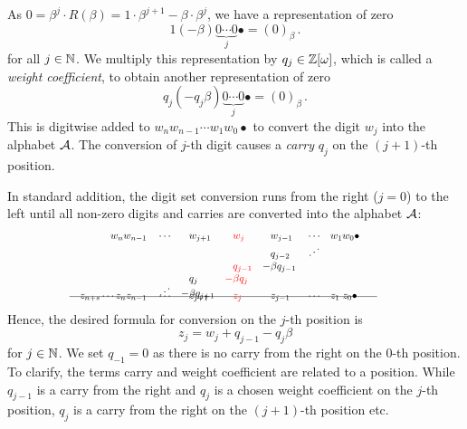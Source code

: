  
As $0=\beta^{j} \cdot R(\beta)=1\cdot \beta^{j+1} -\beta \cdot \beta^{j}$, we have a representation of zero 
$$1 (-\!\beta) \underbrace{0 \cdots 0}_{j}\bullet = (0)_\beta\,. $$
for all $j \in \mathbb{N}$. We multiply this representation by $q_j \in \mathbb{Z}[\omega]$, which is called a \emph{weight coefficient}, to obtain another  representation of zero 
$$q_j (-q_j\beta) \underbrace{0 \cdots 0}_{j}\bullet = (0)_\beta\,. $$ 
This is digitwise added to $w_{n} w_{n-1}\cdots w_1 w_0 \bullet$ to convert the digit $w_j$ into the alphabet $\mathcal{A}$. The conversion of $j$-th digit causes a \emph{carry} $q_{j}$ on the $(j+1)$-th position. 

In standard addition, the digit set conversion runs from the right ($j=0$) to the left until all non-zero digits and carries are converted into the alphabet $\mathcal{A}$:
        \begin{align}
        \label{eq:conversionScheme}
            \hspace{100pt}  w_n w_{n-1}&&&\cdots& &w_{j+1}&\!\! &\textcolor{red}{w_j}  & \!\!  &w_{j-1} &&\cdots &&w_1 w_0\bullet \hspace{100pt} \notag\\[-5pt]
                         &&&&       &       & &     &   &q_{j-2} &&\iddots  \notag \\[-3pt] 
                         &&&&       &       & &\textcolor{red}{q_{j-1}}& -&\beta q_{j-1} \notag \\[-3pt]
                         &&&&         &q_j&   \textcolor{red}{-}&\textcolor{red}{\beta q_j} &&\\[-8pt]
                         &&&  \iddots      &   -&\beta q_{j+1}&   &\ && \notag \\[-17pt]
          \intertext{\hspace{60pt}\line(1,0){300}}
          \notag \\[-30pt]
           z_{n+s} \cdots z_{n} z_{n-1}&&&\cdots& &z_{j+1}& &\textcolor{red}{z_j}& &z_{j-1} &&\cdots &&z_1 \; z_0\bullet \notag                  
        \end{align}
    Hence, the desired formula for conversion on the $j$-th position is 
    \begin{equation*}
        z_j=w_j + q_{j-1} - q_j \beta
    \end{equation*}
    for $j \in \mathbb{N}$. We set $q_{-1}=0$ as there is no carry from the right on the 0-th position. To clarify, the terms carry and weight coefficient are related to a position. While $q_{j-1}$ is a carry from the right  and $q_j$ is a chosen weight coefficient on the $j$-th position, $q_j$ is a carry from the right on the $(j+1)$-th position etc.
    
